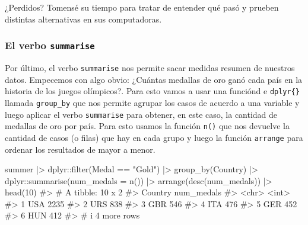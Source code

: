 \documentclass[
  letterpaper,
  DIV=11,
  numbers=noendperiod,
  oneside]{scrreprt}
\newenvironment{Shaded}{\begin{snugshade}}{\end{snugshade}}
\newcommand{\AttributeTok}[1]{\textcolor[rgb]{0.40,0.45,0.13}{#1}}
\newcommand{\CommentTok}[1]{\textcolor[rgb]{0.37,0.37,0.37}{#1}}
\newcommand{\DecValTok}[1]{\textcolor[rgb]{0.68,0.00,0.00}{#1}}
\newcommand{\FunctionTok}[1]{\textcolor[rgb]{0.28,0.35,0.67}{#1}}
\newcommand{\NormalTok}[1]{\textcolor[rgb]{0.00,0.23,0.31}{#1}}
\newcommand{\SpecialCharTok}[1]{\textcolor[rgb]{0.37,0.37,0.37}{#1}}
\newcommand{\StringTok}[1]{\textcolor[rgb]{0.13,0.47,0.30}{#1}}
\begin{document}
¿Perdidos? Tomensé su tiempo para tratar de entender qué pasó y prueben
distintas alternativas en sus computadoras.

\hypertarget{el-verbo-summarise}{%
\subsubsection{\texorpdfstring{El verbo
\texttt{summarise}}{El verbo summarise}}\label{el-verbo-summarise}}

Por último, el verbo \texttt{summarise} nos permite sacar medidas
resumen de nuestros datos. Empecemos con algo obvio: ¿Cuántas medallas
de oro ganó cada país en la historia de los juegos olímpicos?. Para esto
vamos a usar una funciónd e \texttt{dplyr\{\}} llamada
\texttt{group\_by} que nos permite agrupar los casos de acuerdo a una
variable y luego aplicar el verbo \texttt{summarise} para obtener, en
este caso, la cantidad de medallas de oro por país. Para esto usamos la
función \texttt{n()} que nos devuelve la cantidad de casos (o filas) que
hay en cada grupo y luego la función \texttt{arrange} para ordenar los
resultados de mayor a menor.

\begin{Shaded}
\begin{Highlighting}[]
\NormalTok{summer }\SpecialCharTok{|\textgreater{}} 
\NormalTok{  dplyr}\SpecialCharTok{::}\FunctionTok{filter}\NormalTok{(Medal }\SpecialCharTok{==} \StringTok{"Gold"}\NormalTok{) }\SpecialCharTok{|\textgreater{}}
  \FunctionTok{group\_by}\NormalTok{(Country) }\SpecialCharTok{|\textgreater{}}
\NormalTok{  dplyr}\SpecialCharTok{::}\FunctionTok{summarise}\NormalTok{(}\AttributeTok{num\_medals =} \FunctionTok{n}\NormalTok{()) }\SpecialCharTok{|\textgreater{}}
  \FunctionTok{arrange}\NormalTok{(}\FunctionTok{desc}\NormalTok{(num\_medals)) }\SpecialCharTok{|\textgreater{}}
  \FunctionTok{head}\NormalTok{(}\DecValTok{10}\NormalTok{)}
\CommentTok{\#\textgreater{} \# A tibble: 10 x 2}
\CommentTok{\#\textgreater{}   Country num\_medals}
\CommentTok{\#\textgreater{}   \textless{}chr\textgreater{}        \textless{}int\textgreater{}}
\CommentTok{\#\textgreater{} 1 USA           2235}
\CommentTok{\#\textgreater{} 2 URS            838}
\CommentTok{\#\textgreater{} 3 GBR            546}
\CommentTok{\#\textgreater{} 4 ITA            476}
\CommentTok{\#\textgreater{} 5 GER            452}
\CommentTok{\#\textgreater{} 6 HUN            412}
\CommentTok{\#\textgreater{} \# i 4 more rows}
\end{Highlighting}
\end{Shaded}
\end{document}
